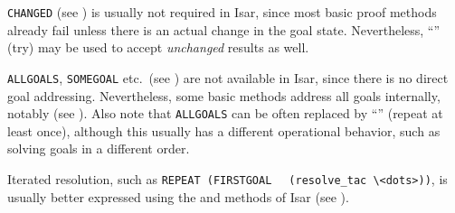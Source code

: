 \begin{isabellebody}
\begin{isamarkuptext}
  \medskip \verb|CHANGED| (see \cite{isabelle-ref}) is usually not
  required in Isar, since most basic proof methods already fail unless
  there is an actual change in the goal state.  Nevertheless, ``''  (try) may be used to accept \emph{unchanged} results as
  well.

  \medskip \verb|ALLGOALS|, \verb|SOMEGOAL| etc.\ (see
  \cite{isabelle-ref}) are not available in Isar, since there is no
  direct goal addressing.  Nevertheless, some basic methods address
  all goals internally, notably \hyperlink{method.simp-all}{\mbox{}} (see
  ).  Also note that \verb|ALLGOALS| can be
  often replaced by ``'' (repeat at least once), although
  this usually has a different operational behavior, such as solving
  goals in a different order.

  \medskip Iterated resolution, such as \verb|REPEAT (FIRSTGOAL|\isasep\isanewline%
\verb|  (resolve_tac \<dots>))|, is usually better expressed using the \hyperlink{method.intro}{\mbox{}} and \hyperlink{method.elim}{\mbox{}} methods of Isar (see
  ).%
\end{isamarkuptext}%
\isamarkuptrue%
%
\isadelimtheory
%
\endisadelimtheory
%
\isatagtheory
{}\isamarkupfalse%
%
\endisatagtheory
{\isafoldtheory}%
%
\isadelimtheory
%
\endisadelimtheory
\isanewline
\end{isabellebody}%
